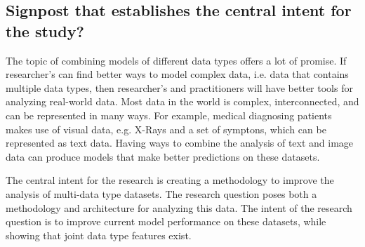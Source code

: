 \subsection{Signpost that establishes the central intent for the study?}

The topic of combining models of different data types offers a lot of promise.  If researcher's can find better ways to model complex data, i.e. data that contains multiple data types, then researcher's and practitioners will have better tools for analyzing real-world data.  Most data in the world is complex, interconnected, and can be represented in many ways.  For example, medical diagnosing patients makes use of visual data, e.g. X-Rays and a set of symptons, which can be represented as text data.  Having ways to combine the analysis of text and image data can produce models that make better predictions on these datasets. %

The central intent for the research is creating a methodology to improve the analysis of multi-data type datasets.  The research question poses both a methodology and architecture for analyzing this data.  The intent of the research question is to improve current model performance on these datasets, while showing that joint data type features exist.



